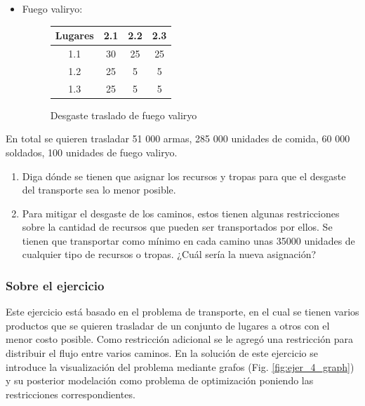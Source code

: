 \documentclass[a4paper,10pt,twocolumn]{article}
\theoremstyle{theorem}
\theoremstyle{definition}
\theoremstyle{remark}
\begin{document}
\begin{itemize}
\item Fuego valiryo:

\begin{figure}[h!]%
	\begin{center}
		\begin{tabular}{|c|c|c|c|} \hline
		Lugares	& 2.1		& 2.2		& 2.3	\\ \hline
		1.1		& 30		& 25		& 25	\\ \hline
		1.2		& 25		&  5		&  5	\\ \hline
		1.3		& 25		&  5		&  5	\\ \hline
		\end{tabular}
	\caption{Desgaste traslado de fuego valiryo}\label{fig:ejer_4_4}
	\end{center}
\end{figure}


\end{itemize}

En total se quieren trasladar 51 000 armas, 285 000 unidades de comida, 60 000 soldados, 100 unidades de fuego valiryo.

\renewcommand{\theenumi}{\alph{enumi}} %

\begin{enumerate}

	\item Diga dónde se tienen que asignar los recursos y tropas para que el desgaste del transporte sea lo menor posible.
	\item Para mitigar el desgaste de los caminos, estos tienen algunas restricciones sobre la cantidad de recursos que pueden ser 
	transportados por ellos. Se tienen que transportar como mínimo en cada camino unas 35000 unidades de cualquier tipo de recursos o tropas. 
	¿Cuál sería la nueva asignación?

\end{enumerate}

		\subsubsection{Sobre el ejercicio}\label{subsubsec:sobre_ejer_4}

Este ejercicio está basado en el problema de transporte, en el cual se tienen varios productos que se quieren trasladar de un conjunto de lugares a otros con el menor costo posible. Como restricción adicional se le agregó una restricción para distribuir el flujo entre varios caminos. En la solución de este ejercicio se introduce la visualización del problema mediante grafos (Fig. \ref{fig:ejer_4_graph}) y su posterior modelación como problema de optimización poniendo las restricciones correspondientes.
\end{document}

